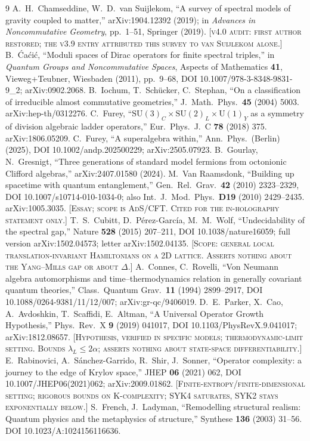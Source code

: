\begin{thebibliography}{9}
A.~H.~Chamseddine, W.~D.~van Suijlekom, ``A survey of spectral models of gravity coupled to matter,'' arXiv:1904.12392 (2019); in \emph{Advances in Noncommutative Geometry}, pp.~1--51, Springer (2019). \textsc{[v4.0 audit: first author restored; the v3.9 entry attributed this survey to van Suijlekom alone.]}
B.~\'{C}a\'{c}i\'{c}, ``Moduli spaces of Dirac operators for finite spectral triples,'' in \emph{Quantum Groups and Noncommutative Spaces}, Aspects of Mathematics \textbf{41}, Vieweg+Teubner, Wiesbaden (2011), pp.~9--68, DOI 10.1007/978-3-8348-9831-9\_2; arXiv:0902.2068.
B.~Iochum, T.~Sch\"{u}cker, C.~Stephan, ``On a classification of irreducible almost commutative geometries,'' J.\ Math.\ Phys.\ \textbf{45} (2004) 5003. arXiv:hep-th/0312276.
C.~Furey, ``$\mathrm{SU}(3)_C\times\mathrm{SU}(2)_L\times\mathrm{U}(1)_Y$ as a symmetry of division algebraic ladder operators,'' Eur.\ Phys.\ J.\ C \textbf{78} (2018) 375. arXiv:1806.05209.
C.~Furey, ``A superalgebra within,'' Ann.\ Phys.\ (Berlin) (2025), DOI 10.1002/andp.202500229; arXiv:2505.07923.
B.~Gourlay, N.~Gresnigt, ``Three generations of standard model fermions from octonionic Clifford algebras,'' arXiv:2407.01580 (2024).
M.~Van Raamsdonk, ``Building up spacetime with quantum entanglement,'' Gen.\ Rel.\ Grav.\ \textbf{42} (2010) 2323--2329, DOI 10.1007/s10714-010-1034-0; also Int.\ J.\ Mod.\ Phys.\ \textbf{D19} (2010) 2429--2435. arXiv:1005.3035. \textsc{[Essay; scope is AdS/CFT. Cited for the in-holography statement only.]}
T.~S.~Cubitt, D.~P\'erez-Garc\'ia, M.~M.~Wolf, ``Undecidability of the spectral gap,'' Nature \textbf{528} (2015) 207--211, DOI 10.1038/nature16059; full version arXiv:1502.04573; letter arXiv:1502.04135. \textsc{[Scope: general local translation-invariant Hamiltonians on a 2D lattice. Asserts nothing about the Yang--Mills gap or about $\Delta$.]}
A.~Connes, C.~Rovelli, ``Von Neumann algebra automorphisms and time--thermodynamics relation in generally covariant quantum theories,'' Class.\ Quantum Grav.\ \textbf{11} (1994) 2899--2917, DOI 10.1088/0264-9381/11/12/007; arXiv:gr-qc/9406019.
D.~E.~Parker, X.~Cao, A.~Avdoshkin, T.~Scaffidi, E.~Altman, ``A Universal Operator Growth Hypothesis,'' Phys.\ Rev.\ X \textbf{9} (2019) 041017, DOI 10.1103/PhysRevX.9.041017; arXiv:1812.08657. \textsc{[Hypothesis, verified in specific models; thermodynamic-limit setting. Bounds $\lambda_L \le 2\alpha$; asserts nothing about state-space differentiability.]}
E.~Rabinovici, A.~S\'anchez-Garrido, R.~Shir, J.~Sonner, ``Operator complexity: a journey to the edge of Krylov space,'' JHEP \textbf{06} (2021) 062, DOI 10.1007/JHEP06(2021)062; arXiv:2009.01862. \textsc{[Finite-entropy/finite-dimensional setting; rigorous bounds on K-complexity; SYK4 saturates, SYK2 stays exponentially below.]}
S.~French, J.~Ladyman, ``Remodelling structural realism: Quantum physics and
the metaphysics of structure,'' Synthese \textbf{136} (2003) 31--56.
DOI 10.1023/A:1024156116636.


\end{thebibliography}
